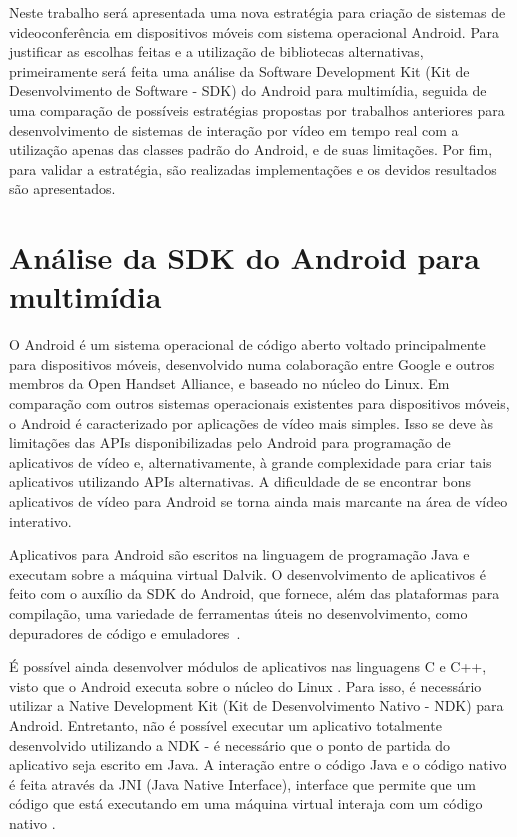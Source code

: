 \documentclass{acm_proc_article-sp}
\begin{document}
Neste trabalho será apresentada uma nova estratégia para criação de sistemas de videoconferência em dispositivos móveis com sistema operacional Android. Para justificar as escolhas feitas e a utilização de bibliotecas alternativas, primeiramente será feita uma análise da Software Development Kit (Kit de Desenvolvimento de Software - SDK) do Android para multimídia, seguida de uma comparação de possíveis estratégias propostas por trabalhos anteriores para desenvolvimento de sistemas de interação por vídeo em tempo real com a utilização apenas das classes padrão do Android, e de suas limitações. Por fim, para validar a estratégia, são realizadas implementações e os devidos resultados são apresentados.

\section{Análise da SDK do Android para multimídia}

O Android é um sistema operacional de código aberto voltado principalmente para dispositivos móveis, desenvolvido numa colaboração entre Google e outros membros da Open Handset Alliance, e baseado no núcleo do Linux. Em comparação com outros sistemas operacionais existentes para dispositivos móveis, o Android é caracterizado por aplicações de vídeo mais simples. Isso se deve às limitações das APIs disponibilizadas pelo Android para programação de aplicativos de vídeo e, alternativamente, à grande complexidade para criar tais aplicativos utilizando APIs alternativas. A dificuldade de se encontrar bons aplicativos de vídeo para Android se torna ainda mais marcante na área de vídeo interativo.

Aplicativos para Android são escritos na linguagem de programação Java e executam sobre a máquina virtual Dalvik. O desenvolvimento de aplicativos é feito com o auxílio da SDK do Android, que fornece, além das plataformas para compilação, uma variedade de ferramentas úteis no desenvolvimento, como depuradores de código e emuladores~\cite{ableson_2009}. 

É possível ainda desenvolver módulos de aplicativos nas linguagens C e C++, visto que o Android executa sobre o núcleo do Linux \cite{fu_2010}. Para isso, é necessário utilizar a Native Development Kit (Kit de Desenvolvimento Nativo - NDK) para Android. Entretanto, não é possível executar um aplicativo totalmente desenvolvido utilizando a NDK - é necessário que o ponto de partida do aplicativo seja escrito em Java. A interação entre o código Java e o código nativo é feita através da JNI (Java Native Interface), interface que permite que um código que está executando em uma máquina virtual interaja com um código nativo \cite{fu_2010}.
\end{document}
